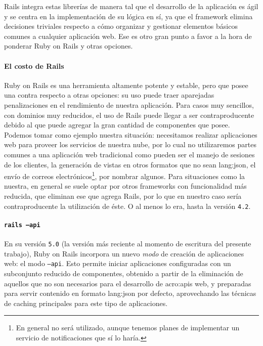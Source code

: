 Rails integra estas librerías de manera tal que el desarrollo de la aplicación es ágil y se centra en la implementación de su lógica en sí, ya que el framework elimina decisiones triviales respecto a cómo organizar y gestionar elementos básicos comunes a cualquier aplicación web. Ese es otro gran punto a favor a la hora de ponderar Ruby on Rails y otras opciones.

\paragraph{El costo de Rails}

Ruby on Rails es una herramienta altamente potente y estable, pero que posee una contra respecto a otras opciones: su uso puede traer aparejadas penalizaciones en el rendimiento de nuestra aplicación. Para casos muy sencillos, con dominios muy reducidos, el uso de Rails puede llegar a ser contraproducente debido al  que puede agregar la gran cantidad de componentes que posee. Podemos tomar como ejemplo nuestra situación: necesitamos realizar aplicaciones web para proveer los servicios de nuestra nube, por lo cual no utilizaremos partes comunes a una aplicación web tradicional como pueden ser el manejo de sesiones de los clientes, la generación de vistas en otros formatos que no sean \gls{lang:json}, el envío de correos electrónicos\footnote{En general no será utilizado, aunque tenemos planes de implementar un servicio de notificaciones que sí lo haría.}, por nombrar algunos. Para situaciones como la nuestra, en general se suele optar por otros frameworks con funcionalidad más reducida, que eliminan ese  que agrega Rails, por lo que en nuestro caso sería contraproducente la utilización de éste. O al menos lo era, hasta la versión \texttt{4.2}.

\paragraph{\texttt{rails --api}}

En su versión \texttt{5.0} (la versión más reciente al momento de escritura del presente trabajo), Ruby on Rails  incorpora un nuevo \textit{modo} de creación de aplicaciones web: el modo \texttt{--api}. Esto permite iniciar aplicaciones configuradas con un subconjunto reducido de componentes, obtenido a partir de la eliminación de aquellos que no son necesarios para el desarrollo de \glspl{acro:api} web, y preparadas para servir contenido en formato \gls{lang:json} por defecto, aprovechando las técnicas de caching principales para este tipo de aplicaciones.
